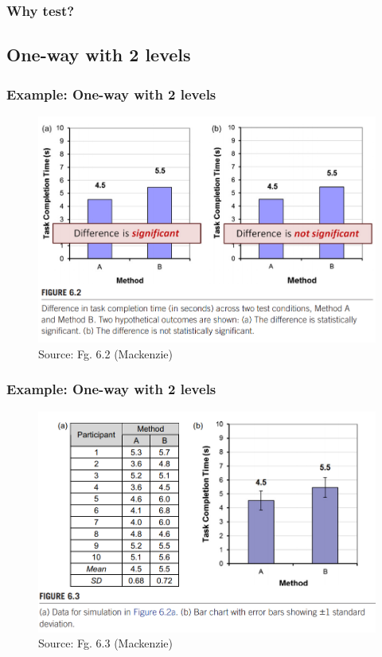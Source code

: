 \documentclass{beamer}
\begin{document}
\begin{frame}
	\frametitle{Why test?}
\end{frame}

\subsection{One-way with 2 levels}

\begin{frame}
	\frametitle{Example: One-way with 2 levels} 
	\begin{figure}
		\includegraphics[width=0.8\linewidth]{result}
		\caption{Source: Fg. 6.2 (Mackenzie)}
	\end{figure}
	
\end{frame}

\begin{frame}
	\frametitle{Example: One-way with 2 levels} 
	\begin{figure}
		\includegraphics[width=0.8\linewidth]{resulta}
		\caption{Source: Fg. 6.3 (Mackenzie)}
	\end{figure}
	
\end{frame}
\end{document}
